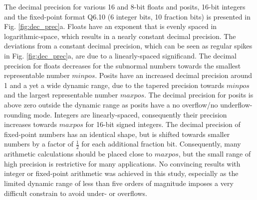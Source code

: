 \documentclass[draft]{agujournal2019}
\begin{document}
The decimal precision for various 16 and 8-bit floats and posits, 16-bit integers
and the fixed-point format Q6.10 (6 integer bits, 10 fraction bits) is presented
in Fig. \ref{fig:dec_prec}a. Floats have an exponent that is evenly spaced in
logarithmic-space, which results in a nearly constant decimal precision. The deviations
from a constant decimal precision, which can be seen as regular spikes in Fig. \ref{fig:dec_prec}a,
are due to a linearly-spaced significand. The decimal precision for floats decreases
for the subnormal numbers towards the smallest representable number $minpos$.
Posits have an increased decimal precision around 1 and a yet a wide dynamic range,
due to the tapered precision towards $minpos$ and the largest representable number
$maxpos$. The decimal precision for posits is above zero outside the dynamic range
as posits have a no overflow/no underflow-rounding mode. Integers are linearly-spaced,
consequently their precision increases towards $maxpos$ for 16-bit signed integers.
The decimal precision of fixed-point numbers has an identical shape, but is shifted
towards smaller numbers by a factor of $\tfrac{1}{2}$ for each additional fraction bit.
Consequently, many arithmetic calculations should be placed close to $maxpos$, but
the small range of high precision is restrictive for many applications. No convincing results
with integer or fixed-point arithmetic was achieved in this study, especially as
the limited dynamic range of less than five orders of magnitude imposes a very difficult
constrain to avoid under- or overflows.
\end{document}
